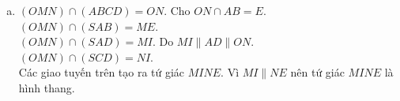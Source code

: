 \begin{ex}
{\begin{enumerate}[a.]
Ta có $\heva{&IH \parallel SA \\&HK \parallel AB\\& IH \cap HK = H}$ do đó $(IHK) \parallel(SAB)$.\\
Vậy $\heva{&IJ \subset(IHK) \\ &(IHK) \parallel(SAB)} \Rightarrow IJ \parallel(SAB)$.
\item $(OMN) \cap(ABCD)=ON$. Cho $ON \cap AB=E$.\\
$(OMN) \cap(SAB)=ME$.\\
$(OMN) \cap(SAD)=MI$. Do $MI \parallel AD \parallel ON$.\\
$(OMN) \cap(SCD)=NI$.\\
Các giao tuyến trên tạo ra tứ giác $MINE$. Vì $MI \parallel NE$ nên tứ giác $MINE$ là hình thang.
\end{enumerate}
}
\end{ex}
